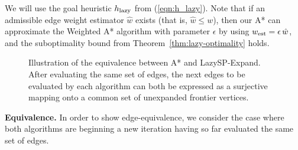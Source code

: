 \documentclass[nobib]{tufte-book}
\newcommand{\ms}[1]{\mbox{\scriptsize #1}}
\begin{document}
We will use the goal heuristic $h_{\ms{lazy}}$ from (\ref{eqn:h_lazy}).
Note that if an admissible edge weight estimator $\hat{w}$ exists
(that is, $\hat{w} \leq w$),
then our A* can approximate the Weighted A* algorithm
\citep{pohl1970weightedastar}
with parameter $\epsilon$
by using $w_{\ms{est}} = \epsilon \, \hat{w}$,
and the suboptimality bound from
Theorem~\ref{thm:lazy-optimality} holds.

\begin{figure}[t]
   \centering
   \caption{Illustration of the equivalence
      between A* and LazySP-Expand.
      After evaluating the same set of edges,
      the next edges to be evaluated by each algorithm
      can both be expressed as a surjective mapping onto
      a common set of unexpanded
      frontier vertices.
      }
   \label{fig:astar-equiv-mapping}
\end{figure}

\textbf{Equivalence.}
In order to show edge-equivalence,
we consider the case where both algorithms
are beginning a new iteration
having so far evaluated the same set of edges.
\end{document}
